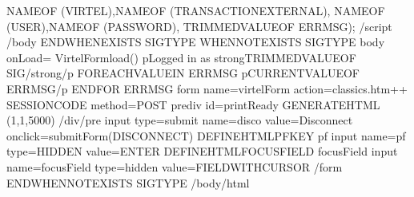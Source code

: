 \documentclass[letterpaper,10pt,english]{sphinxmanual}
\begin{document}
\begin{sphinxVerbatim}[commandchars=\\\{\}]
\PYGZdq{}\PYGZob{}\PYGZob{}\PYGZob{}NAME\PYGZhy{}OF (VIRTEL)\PYGZcb{}\PYGZcb{}\PYGZcb{}\PYGZdq{},\PYGZdq{}\PYGZob{}\PYGZob{}\PYGZob{}NAME\PYGZhy{}OF (TRANSACTION\PYGZhy{}EXTERNAL)\PYGZcb{}\PYGZcb{}\PYGZcb{}\PYGZdq{},
\PYGZdq{}\PYGZob{}\PYGZob{}\PYGZob{}NAME\PYGZhy{}OF (USER)\PYGZcb{}\PYGZcb{}\PYGZcb{}\PYGZdq{},\PYGZdq{}\PYGZob{}\PYGZob{}\PYGZob{}NAME\PYGZhy{}OF (PASSWORD)\PYGZcb{}\PYGZcb{}\PYGZcb{}\PYGZdq{},
\PYGZdq{}\PYGZob{}\PYGZob{}\PYGZob{}TRIMMED\PYGZhy{}VALUE\PYGZhy{}OF \PYGZdq{}\PYGZdl{}ERRMSG\PYGZdl{}\PYGZdq{}\PYGZcb{}\PYGZcb{}\PYGZcb{}\PYGZdq{});
\PYGZlt{}/script\PYGZgt{}
\PYGZlt{}/body\PYGZgt{}
\PYGZob{}\PYGZob{}\PYGZob{}END\PYGZhy{}WHEN\PYGZhy{}EXISTS \PYGZdq{}\PYGZdl{}\PYGZdl{}SIGTYPE\PYGZdq{}\PYGZcb{}\PYGZcb{}\PYGZcb{}
\PYGZob{}\PYGZob{}\PYGZob{}WHEN\PYGZhy{}NOT\PYGZhy{}EXISTS \PYGZdq{}\PYGZdl{}\PYGZdl{}SIGTYPE\PYGZdq{}\PYGZcb{}\PYGZcb{}\PYGZcb{}
\PYGZlt{}body onLoad=\PYGZdq{} VirtelFormload()\PYGZdq{}\PYGZgt{}
\PYGZlt{}p\PYGZgt{}Logged in as \PYGZlt{}strong\PYGZgt{}\PYGZob{}\PYGZob{}\PYGZob{}TRIMMED\PYGZhy{}VALUE\PYGZhy{}OF \PYGZdq{}\PYGZdl{}\PYGZdl{}SIG\PYGZdq{}\PYGZcb{}\PYGZcb{}\PYGZcb{}\PYGZlt{}/strong\PYGZgt{}\PYGZlt{}/p\PYGZgt{}
\PYGZob{}\PYGZob{}\PYGZob{}FOR\PYGZhy{}EACH\PYGZhy{}VALUE\PYGZhy{}IN \PYGZdq{}\PYGZdl{}ERRMSG\PYGZdl{}\PYGZdq{}\PYGZcb{}\PYGZcb{}\PYGZcb{}
\PYGZlt{}p\PYGZgt{}\PYGZob{}\PYGZob{}\PYGZob{}CURRENT\PYGZhy{}VALUE\PYGZhy{}OF \PYGZdq{}\PYGZdl{}ERRMSG\PYGZdl{}\PYGZdq{}\PYGZcb{}\PYGZcb{}\PYGZcb{}\PYGZlt{}/p\PYGZgt{}
\PYGZob{}\PYGZob{}\PYGZob{}END\PYGZhy{}FOR \PYGZdq{}\PYGZdl{}ERRMSG\PYGZdl{}\PYGZdq{}\PYGZcb{}\PYGZcb{}\PYGZcb{}
\PYGZlt{}form name=virtelForm
    action=\PYGZdq{}classics.htm++\PYGZob{}\PYGZob{}\PYGZob{} SESSION\PYGZhy{}CODE \PYGZcb{}\PYGZcb{}\PYGZcb{}\PYGZdq{} method=\PYGZdq{}POST\PYGZdq{}\PYGZgt{}
\PYGZlt{}pre\PYGZgt{}\PYGZlt{}div id=\PYGZdq{}printReady\PYGZdq{}\PYGZgt{}\PYGZob{}\PYGZob{}\PYGZob{} GENERATE\PYGZhy{}HTML (1,1,5000) \PYGZcb{}\PYGZcb{}\PYGZcb{}\PYGZlt{}/div\PYGZgt{}\PYGZlt{}/pre\PYGZgt{}
\PYGZlt{}input type=\PYGZdq{}submit\PYGZdq{} name=\PYGZdq{}disco\PYGZdq{} value=\PYGZdq{}Disconnect\PYGZdq{}
    onclick=\PYGZdq{}submitForm(\PYGZsq{}DISCONNECT\PYGZsq{})\PYGZdq{} \PYGZgt{}
\PYGZob{}\PYGZob{}\PYGZob{} DEFINE\PYGZhy{}HTML\PYGZhy{}PFKEY \PYGZdq{}pf\PYGZdq{} \PYGZcb{}\PYGZcb{}\PYGZcb{}\PYGZlt{}input name=\PYGZdq{}pf\PYGZdq{} type=\PYGZdq{}HIDDEN\PYGZdq{} value=\PYGZdq{}ENTER\PYGZdq{}\PYGZgt{}
\PYGZob{}\PYGZob{}\PYGZob{} DEFINE\PYGZhy{}HTML\PYGZhy{}FOCUS\PYGZhy{}FIELD \PYGZdq{}focusField\PYGZdq{} \PYGZcb{}\PYGZcb{}\PYGZcb{}
\PYGZlt{}input name=\PYGZdq{}focusField\PYGZdq{} type=\PYGZdq{}hidden\PYGZdq{} value=\PYGZdq{}\PYGZob{}\PYGZob{}\PYGZob{}FIELD\PYGZhy{}WITH\PYGZhy{}CURSOR\PYGZcb{}\PYGZcb{}\PYGZcb{}\PYGZdq{}\PYGZgt{}
\PYGZlt{}/form\PYGZgt{}
\PYGZob{}\PYGZob{}\PYGZob{}END\PYGZhy{}WHEN\PYGZhy{}NOT\PYGZhy{}EXISTS \PYGZdq{}\PYGZdl{}\PYGZdl{}SIGTYPE\PYGZdq{}\PYGZcb{}\PYGZcb{}\PYGZcb{}
\PYGZlt{}/body\PYGZgt{}\PYGZlt{}/html\PYGZgt{}
\end{sphinxVerbatim}
\end{document}
